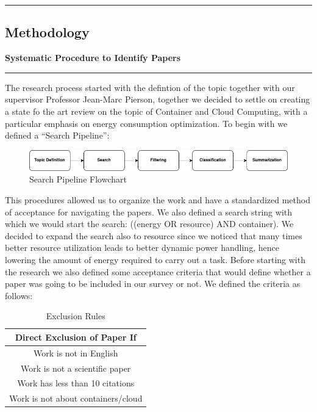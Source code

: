 {\color{gray}\hrule}
\begin{center}
\section{Methodology}
\textbf{Systematic Procedure to Identify Papers}
\bigskip
\end{center}
{\color{gray}\hrule}
\begin{multicols}{2}
The research process started with the defintion of the topic together with our supervisor Professor Jean-Marc Pierson, together we decided to settle on creating a state fo the art review on the topic of Container and Cloud Computing, with a particular emphasis on energy consumption optimization. 
To begin with we defined a ``Search Pipeline'':

\begin{figure}[H]
    \centering
    \includegraphics[width=\columnwidth]{flowchartTIR.png}
    \caption{Search Pipeline Flowchart}
    \label{fig:search_pipeline}
\end{figure}

This procedures allowed us to organize the work and have a standardized method of acceptance for navigating the papers. 
We also defined a search string with which we would start the search: ((energy OR resource) AND container).
We decided to expand the search also to resource since we noticed that many times better resource utilization leads to better dynamic power handling, hence lowering the amount of energy required to carry out a task.
Before starting with the research we also defined some acceptance criteria that would define whether a paper was going to be included in our survey or not. We defined the criteria as follows:

\begin{table}[H]
\centering
\begin{tabular}{c}
\hline
Direct Exclusion of Paper If \\ \hline
Work is not in English \\ 
Work is not a scientific paper \\ 
Work has less than 10 citations \\ 
Work is not about containers/cloud \\ \hline
\end{tabular}
    \caption{Exclusion Rules}
    \label{tab:Exclusion Rules}
\end{table}


\end{multicols}

